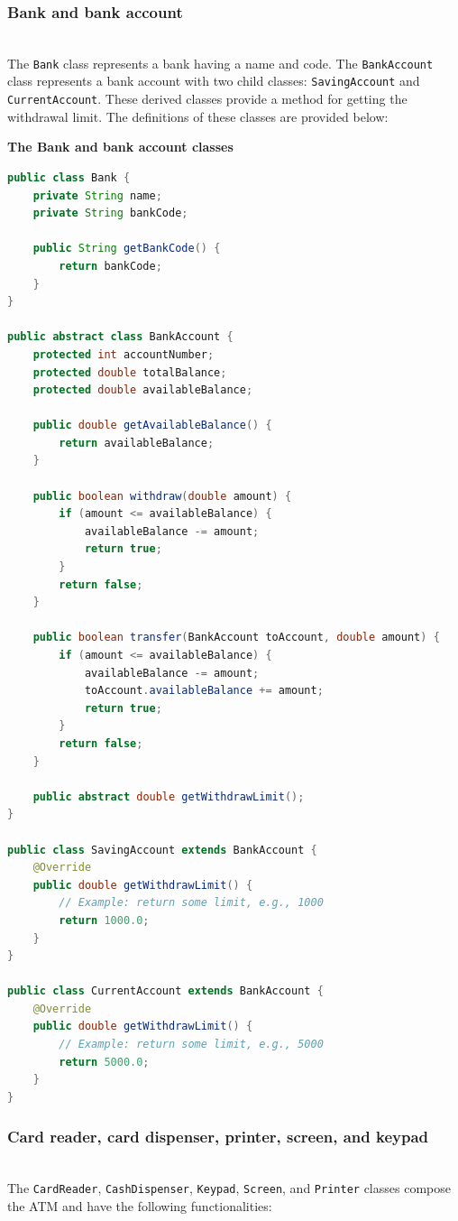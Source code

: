 \subsubsection{Bank and bank account}\label{d6DcwCJ0jKUAiX5iUpOvw-2}
\\
The \texttt{Bank} class represents a bank having a name and code. The
\texttt{BankAccount} class represents a bank account with two child classes: \texttt{SavingAccount} and \texttt{CurrentAccount}. These derived classes provide a method for getting the withdrawal limit. The definitions of these classes are provided below:

\textbf{The Bank and bank account classes}

\begin{lstlisting}[language=Java]
public class Bank {
    private String name;
    private String bankCode;

    public String getBankCode() {
        return bankCode;
    }
}

public abstract class BankAccount {
    protected int accountNumber;
    protected double totalBalance;
    protected double availableBalance;

    public double getAvailableBalance() {
        return availableBalance;
    }

    public boolean withdraw(double amount) {
        if (amount <= availableBalance) {
            availableBalance -= amount;
            return true;
        }
        return false;
    }

    public boolean transfer(BankAccount toAccount, double amount) {
        if (amount <= availableBalance) {
            availableBalance -= amount;
            toAccount.availableBalance += amount;
            return true;
        }
        return false;
    }

    public abstract double getWithdrawLimit();
}

public class SavingAccount extends BankAccount {
    @Override
    public double getWithdrawLimit() {
        // Example: return some limit, e.g., 1000
        return 1000.0;
    }
}

public class CurrentAccount extends BankAccount {
    @Override
    public double getWithdrawLimit() {
        // Example: return some limit, e.g., 5000
        return 5000.0;
    }
}
\end{lstlisting}

\subsubsection{Card reader, card dispenser, printer, screen, and keypad}\label{d6DcwCJ0jKUAiX5iUpOvw-3}
\\
The \texttt{CardReader}, \texttt{CashDispenser}, \texttt{Keypad}, \texttt{Screen}, and \texttt{Printer} classes compose the ATM and have the following functionalities:

